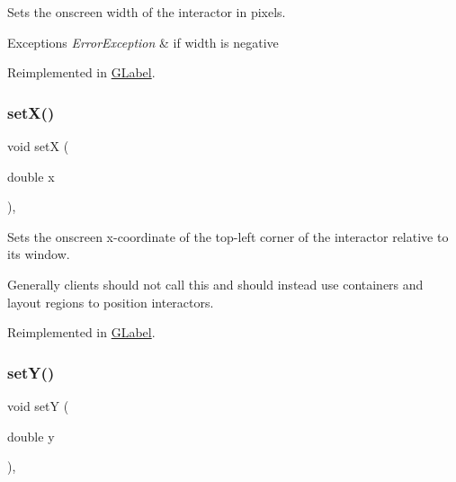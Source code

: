 Sets the onscreen width of the interactor in pixels. 


\begin{DoxyExceptions}{Exceptions}
{\em Error\+Exception} & if width is negative \\
\hline
\end{DoxyExceptions}


Reimplemented in \mbox{\hyperlink{classsgl_1_1GLabel_af0c5b6fb4e3c3c9a3fabde548efa93db}{G\+Label}}.

\mbox{\label{classsgl_1_1GInteractor_a9c18fcc579333bf9653d13ad2b372e39}} 
\subsubsection{\texorpdfstring{set\+X()}{setX()}}
{\footnotesize\ttfamily void setX (\begin{DoxyParamCaption}\item[{double}]{x }\end{DoxyParamCaption})\hspace{0.3cm}{\ttfamily [virtual]}, {\ttfamily [inherited]}}



Sets the onscreen x-\/coordinate of the top-\/left corner of the interactor relative to its window. 

Generally clients should not call this and should instead use containers and layout regions to position interactors. 

Reimplemented in \mbox{\hyperlink{classsgl_1_1GLabel_a173837ba805eaa2411e88834869d3a9c}{G\+Label}}.

\mbox{\label{classsgl_1_1GInteractor_a7d57e2a5c35d27feb58fd498a3cf82b9}} 
\subsubsection{\texorpdfstring{set\+Y()}{setY()}}
{\footnotesize\ttfamily void setY (\begin{DoxyParamCaption}\item[{double}]{y }\end{DoxyParamCaption})\hspace{0.3cm}{\ttfamily [virtual]}, {\ttfamily [inherited]}}



